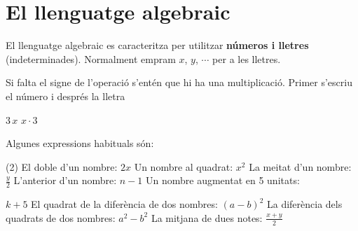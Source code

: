 \begin{iniaval}
\begin{center}
\end{center}



\end{iniaval}

\vspace*{\fill} 

\pagebreak

\section{El llenguatge algebraic}


\begin{theorybox}
	 El llenguatge algebraic es caracteritza per utilitzar \textbf{números i lletres} (indeterminades). Normalment empram $x$, $y$, $\cdots$ per a les lletres.
	 
	 Si falta el signe de l'operació s'entén que hi ha una multiplicació. Primer s'escriu el número i després la lletra
	 \begin{center}
	 \be \quad \quad $\boxed{3\,x}$	\quad \quad\quad \quad \quad \quad  \malament  \quad \quad $\boxed{x\cdot3}$
	 \end{center}
 
	 Algunes expressions habituals són:
	 \begin{tasks}(2)
	 	\task[-] El doble d'un nombre: $2x$
	 	\task[-] Un nombre al quadrat: $x^2$
	 	\task[-] La meitat d'un nombre: $\frac{y}{2}$
	 	\task[-] L'anterior d'un nombre: $n-1$
	 	\task[-] Un nombre augmentat en 5 unitats: 
	 	
	 	$k+5$
	 	\task[-] El quadrat de la diferència de dos nombres: $(a-b)^2$
	 	\task[-] La diferència dels quadrats de dos nombres: $a^2 - b^2$
	 	\task[-] La mitjana de dues notes: $\frac{x+y}{2}$
	 \end{tasks}
	          
\end{theorybox}

